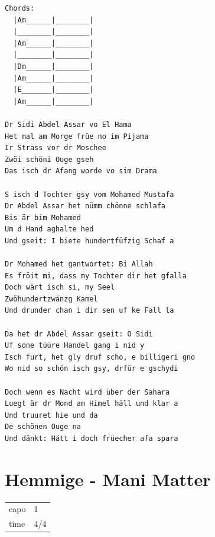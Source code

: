 \documentclass[
]{book}
\let\stdsection\section
\renewcommand\section{\clearpage\stdsection}
\begin{document}
\begin{verbatim}
Chords:
  |Am______|________|
  |________|________|
  |Am______|________|
  |________|________|
  |Dm______|________|
  |Am______|________|
  |E_______|________|
  |Am______|________|

Dr Sidi Abdel Assar vo El Hama
Het mal am Morge früe no im Pijama
Ir Strass vor dr Moschee
Zwöi schöni Ouge gseh
Das isch dr Afang worde vo sim Drama

S isch d Tochter gsy vom Mohamed Mustafa
Dr Abdel Assar het nümm chönne schlafa
Bis är bim Mohamed
Um d Hand aghalte hed
Und gseit: I biete hundertfüfzig Schaf a

Dr Mohamed het gantwortet: Bi Allah
Es fröit mi, dass my Tochter dir het gfalla
Doch wärt isch si, my Seel
Zwöhundertzwänzg Kamel
Und drunder chan i dir sen uf ke Fall la

Da het dr Abdel Assar gseit: O Sidi
Uf sone tüüre Handel gang i nid y
Isch furt, het gly druf scho, e billigeri gno
Wo nid so schön isch gsy, drfür e gschydi

Doch wenn es Nacht wird über der Sahara
Luegt är dr Mond am Himel häll und klar a
Und truuret hie und da
De schönen Ouge na
Und dänkt: Hätt i doch früecher afa spara
\end{verbatim}

\hypertarget{mundart-und-deutsch-hemmige}{%
\section{Hemmige - Mani Matter}\label{mundart-und-deutsch-hemmige}}

\begin{longtable}[]{@{}ll@{}}
\toprule
\endhead
capo & 1\tabularnewline
time & 4/4\tabularnewline
\bottomrule
\end{longtable}
\end{document}
